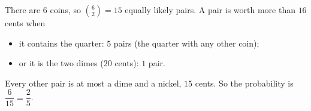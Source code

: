 There are $6$ coins, so $\binom62=15$ equally likely pairs. A pair is worth more than $16$ cents when
\begin{itemize}
\item it contains the quarter: $5$ pairs (the quarter with any other coin);
\item or it is the two dimes ($20$ cents): $1$ pair.
\end{itemize}
Every other pair is at most a dime and a nickel, $15$ cents. So the probability is $\dfrac{6}{15}=\boxed{\dfrac{2}{5}}$.
